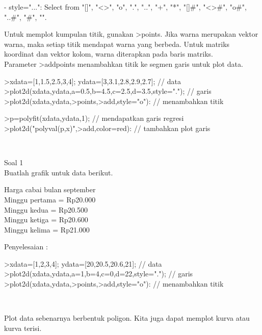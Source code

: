 \begin{eulernotebook}
\begin{eulercomment}
- style="...": Select from "[]", "\textless{}\textgreater{}", "o", ".", "..", "+", "*",
"[]#", "\textless{}\textgreater{}#", "o#", "..#", "#", "\textbar{}".

Untuk memplot kumpulan titik, gunakan \textgreater{}points. Jika warna merupakan
vektor warna, maka setiap titik mendapat warna yang berbeda. Untuk
matriks koordinat dan vektor kolom, warna diterapkan pada baris
matriks.\\
Parameter \textgreater{}addpoints menambahkan titik ke segmen garis untuk plot
data.
\end{eulercomment}
\begin{eulerprompt}
>xdata=[1,1.5,2.5,3,4]; ydata=[3,3.1,2.8,2.9,2.7]; // data
>plot2d(xdata,ydata,a=0.5,b=4.5,c=2.5,d=3.5,style="."); // garis
>plot2d(xdata,ydata,>points,>add,style="o"): // menambahkan titik
\end{eulerprompt}
\begin{eulerprompt}
>p=polyfit(xdata,ydata,1); // mendapatkan garis regresi
>plot2d("polyval(p,x)",>add,color=red): // tambahkan plot garis
\end{eulerprompt}
\begin{eulercomment}
\\

\end{eulercomment}
\begin{eulercomment}
Soal 1\\
Buatlah grafik untuk data berikut.

Harga cabai bulan september\\
Minggu pertama = Rp20.000\\
Minggu kedua = Rp20.500\\
Minggu ketiga = Rp20.600\\
Minggu kelima = Rp21.000

Penyelesaian :
\end{eulercomment}
\begin{eulerprompt}
>xdata=[1,2,3,4]; ydata=[20,20.5,20.6,21]; // data
>plot2d(xdata,ydata,a=1,b=4,c=0,d=22,style="."); // garis
>plot2d(xdata,ydata,>points,>add,style="o"): // menambahkan titik
\end{eulerprompt}
\\

\begin{eulercomment}
Plot data sebenarnya berbentuk poligon. Kita juga dapat memplot kurva
atau kurva terisi.


\end{eulercomment}
\end{eulernotebook}
